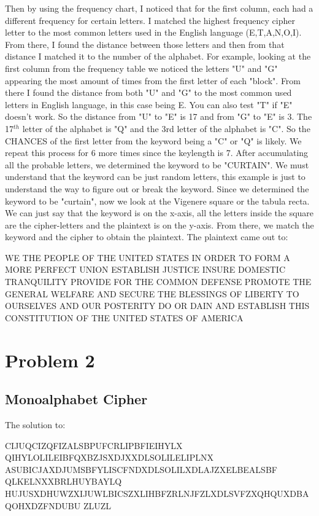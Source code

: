 \documentclass[a4paper,11pt]{article}
\theoremstyle{mytheor}
\begin{document}
\bigskip
Then by using the frequency chart, I noticed that for the first column, each had a different frequency for certain letters. I matched the highest frequency cipher letter to the most common letters used in the English language (E,T,A,N,O,I). From there, I found the distance between those letters and then from that distance I matched it to the number of the alphabet. For example, looking at the first column from the frequency table we noticed the letters "U" and "G" appearing the most amount of times from the first letter of each "block". From there I found the distance from both "U" and "G" to the most common used letters in English language, in this case being E. You can also test "T" if "E" doesn't work. So the distance from "U" to "E" is 17 and from "G" to "E" is 3. The 17$^{th}$ letter of the alphabet is "Q" and the 3rd letter of the alphabet is "C". So the CHANCES of the first letter from the keyword being a "C" or "Q" is likely. We repeat this process for 6 more times since the keylength is 7.  After accumulating all the probable letters, we determined the keyword to be "CURTAIN". We must understand that the keyword can be just random letters, this example is just to understand the way to figure out or break the keyword. Since we determined the keyword to be "curtain", now we look at the Vigenere square or the tabula recta. We can just say that the keyword is on the x-axis, all the letters inside the square are the cipher-letters and the plaintext is on the y-axis. From there, we match the keyword and the cipher to obtain the plaintext. \newline The plaintext came out to:
\bigskip

\noindent WE THE PEOPLE OF THE UNITED STATES IN ORDER TO FORM A MORE PERFECT UNION ESTABLISH JUSTICE INSURE DOMESTIC TRANQUILITY PROVIDE FOR THE COMMON DEFENSE PROMOTE THE GENERAL WELFARE AND SECURE THE BLESSINGS OF LIBERTY TO OURSELVES AND OUR POSTERITY DO OR DAIN AND ESTABLISH THIS CONSTITUTION OF THE UNITED STATES OF AMERICA




\section*{Problem 2}
\subsection*{Monoalphabet Cipher}
The solution to: 
\bigskip

\noindent CIJUQCIZQFIZALSBPUFCRLIPBFIEIHYLX
QIHYLOLILEIBFQXBZJSXDJXXDLSOLILELIPLNX
ASUBICJAXDJUMSBFYLISCFNDXDLSOLILXDLAJZXELBEALSBF
QLKELNXXBRLHUYBAYLQ
HUJUSXDHUWZXIJUWLBICSZXLIHBFZRLNJFZLXDLSVFZXQHQUXDBAQOHXDZFNDUBU
ZLUZL
\bigskip
\end{document}
